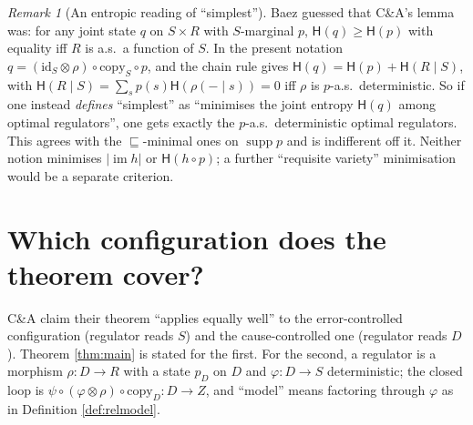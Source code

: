 \documentclass[11pt,a4paper]{article}
\theoremstyle{definition}
\theoremstyle{remark}
\newtheorem{remark}[theorem]{Remark}
\newcommand{\copym}[1]{\mathrm{copy}_{#1}}
\newcommand{\id}{\mathrm{id}}
\newcommand{\supp}{\operatorname{supp}}
\newcommand{\im}{\operatorname{im}}
\newcommand{\ent}{\mathsf{H}}
\newcommand{\refines}{\sqsubseteq}
\begin{document}
\begin{remark}[An entropic reading of ``simplest'']\label{rem:entropic}
Baez \cite{Baez2016} guessed that C\&A's lemma was: for any joint state $q$ on $S\times R$ with $S$-marginal $p$, $\ent(q)\ge\ent(p)$ with equality iff $R$ is a.s.\ a function of $S$. In the present notation $q=(\id_S\otimes\rho)\circ\copym{S}\circ p$, and the chain rule gives $\ent(q)=\ent(p)+\ent(R\mid S)$, with $\ent(R\mid S)=\sum_s p(s)\ent(\rho(-\mid s))=0$ iff $\rho$ is $p$-a.s.\ deterministic. So if one instead \emph{defines} ``simplest'' as ``minimises the joint entropy $\ent(q)$ among optimal regulators'', one gets exactly the $p$-a.s.\ deterministic optimal regulators. This agrees with the $\refines$-minimal ones on $\supp p$ and is indifferent off it. Neither notion minimises $|\im h|$ or $\ent(h\circ p)$; a further ``requisite variety'' minimisation would be a separate criterion.
\end{remark}

\section{Which configuration does the theorem cover?}\label{sec:config}

C\&A claim their theorem ``applies equally well'' to the error-controlled
configuration (regulator reads $S$) and the cause-controlled one (regulator reads
$D$). Theorem \ref{thm:main} is stated for the first. For the second, a
regulator is a morphism $\rho\colon D\to R$ with a state $p_D$ on $D$ and
$\varphi\colon D\to S$ deterministic; the closed loop is
$\psi\circ(\varphi\otimes\rho)\circ\copym{D}\colon D\to Z$, and ``model'' means
factoring through $\varphi$ as in Definition \ref{def:relmodel}.
\end{document}
